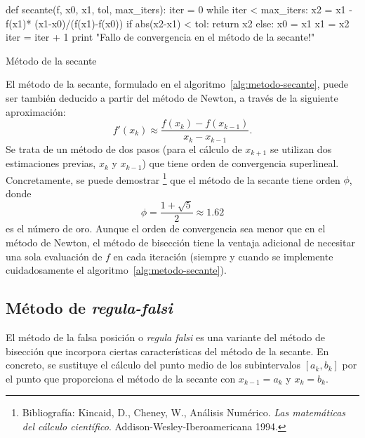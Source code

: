 \begin{algorithm}  \begin{python}
def secante(f, x0, x1, tol, max_iters):
    iter = 0
    while iter < max_iters:
        x2 = x1 - f(x1)* (x1-x0)/(f(x1)-f(x0))
        if abs(x2-x1) < tol: 
            return x2
        else:
            x0 = x1
            x1 = x2
            iter = iter + 1        
    print "Fallo de convergencia en el método de la secante!"
\end{python}
\caption{Método de la secante}
\label{alg:metodo-secante}
\end{algorithm}
El método de la secante, formulado en el
algoritmo~\ref{alg:metodo-secante}, puede ser también deducido a
partir del método de Newton, a través de la siguiente aproximación:
\begin{equation*}
  f'(x_k) \approx  \frac{f(x_k)-f(x_{k-1})}{x_k-x_{k-1}}.
\end{equation*}
Se trata de un método de dos pasos (para el cálculo de $x_{k+1}$ se
utilizan dos estimaciones previas, $x_k$ y $x_{k-1}$) que tiene orden
de convergencia superlineal. Concretamente, se puede demostrar%
\footnote{\textsf{Bibliografía}: Kincaid, D., Cheney, W., Análisis
  Numérico. \textit{Las matemáticas del cálculo
    científico}. Addison-Wesley-Iberoamericana 1994.}  que el método
de la secante tiene orden $\phi$, donde
$$
\phi=\frac{1 + \sqrt 5}{2} \approx 1.62
$$
es el número de oro. Aunque el orden de convergencia sea menor que en
el método de Newton, el método de bisección tiene la ventaja adicional
de necesitar una sola evaluación de $f$ en cada iteración (siempre y
cuando se implemente cuidadosamente el algoritmo~\ref{alg:metodo-secante}).

\subsection{Método de \emph{regula-falsi}}
\label{sec:metodo-de-regula-falsi}

El método de la falsa posición o \emph{regula falsi} es una variante del
método de bisección que incorpora ciertas características del método
de la secante. En concreto, se sustituye el cálculo del punto medio de
los subintervalos $[a_k,b_k]$ por el punto que proporciona el método
de la secante con $x_{k-1}=a_k$ y $x_k=b_k$.

